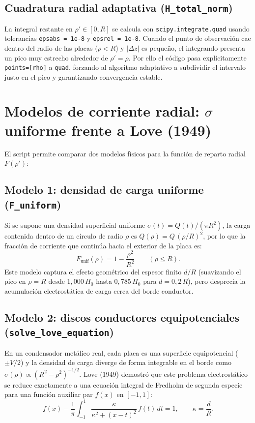 \documentclass[11pt]{article}
\begin{document}
\subsection{Cuadratura radial adaptativa (\texttt{H\_total\_norm})}

La integral restante en $\rho' \in [0, R]$ se calcula con \texttt{scipy.integrate.quad} usando tolerancias \texttt{epsabs = 1e-8} y \texttt{epsrel = 1e-8}. Cuando el punto de observación cae dentro del radio de las placas ($\rho < R$) y $|\Delta z|$ es pequeño, el integrando presenta un pico muy estrecho alrededor de $\rho' = \rho$. Por ello el código pasa explícitamente \texttt{points=[rho]} a \texttt{quad}, forzando al algoritmo adaptativo a subdividir el intervalo justo en el pico y garantizando convergencia estable.

\section{Modelos de corriente radial: $\sigma$ uniforme frente a Love (1949)}

El script permite comparar dos modelos físicos para la función de reparto radial $F(\rho')$:

\subsection{Modelo 1: densidad de carga uniforme (\texttt{F\_uniform})}

Si se supone una densidad superficial uniforme $\sigma(t) = Q(t)/(\pi R^2)$, la carga contenida dentro de un círculo de radio $\rho$ es $Q(\rho) = Q\,(\rho/R)^2$, por lo que la fracción de corriente que continúa hacia el exterior de la placa es:
\begin{equation}
    F_{\mathrm{unif}}(\rho) = 1 - \frac{\rho^2}{R^2} \qquad (\rho \le R).
\end{equation}
Este modelo captura el efecto geométrico del espesor finito $d/R$ (suavizando el pico en $\rho = R$ desde $1{,}000\,H_0$ hasta $0{,}785\,H_0$ para $d = 0{,}2\,R$), pero desprecia la acumulación electrostática de carga cerca del borde conductor.

\subsection{Modelo 2: discos conductores equipotenciales (\texttt{solve\_love\_equation})}

En un condensador metálico real, cada placa es una superficie equipotencial ($\pm V/2$) y la densidad de carga diverge de forma integrable en el borde como $\sigma(\rho) \propto (R^2 - \rho^2)^{-1/2}$. Love (1949) demostró que este problema electrostático se reduce exactamente a una ecuación integral de Fredholm de segunda especie para una función auxiliar par $f(x)$ en $[-1, 1]$:
\begin{equation}
    f(x) - \frac{1}{\pi} \int_{-1}^{1} \frac{\kappa}{\kappa^2 + (x - t)^2}\,f(t)\,dt = 1, \qquad \kappa = \frac{d}{R}.
    \label{eq:love}
\end{equation}
\end{document}
